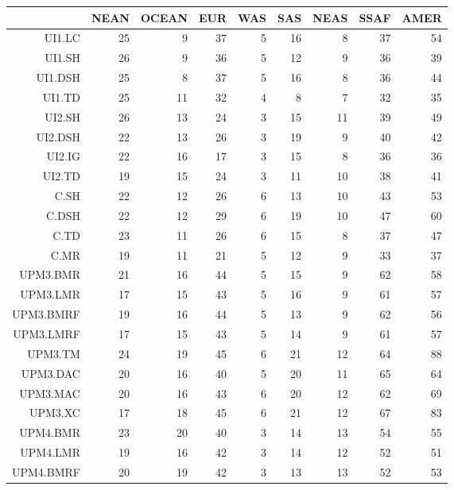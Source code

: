 \begin{longtable}{rrrrrrrrr}
  \hline
 & NEAN & OCEAN & EUR & WAS & SAS & NEAS & SSAF & AMER \\ 
  \hline
UI1.LC &  25 &   9 &  37 &   5 &  16 &   8 &  37 &  54 \\ 
  UI1.SH &  26 &   9 &  36 &   5 &  12 &   9 &  36 &  39 \\ 
  UI1.DSH &  25 &   8 &  37 &   5 &  16 &   8 &  36 &  44 \\ 
  UI1.TD &  25 &  11 &  32 &   4 &   8 &   7 &  32 &  35 \\ 
  UI2.SH &  26 &  13 &  24 &   3 &  15 &  11 &  39 &  49 \\ 
  UI2.DSH &  22 &  13 &  26 &   3 &  19 &   9 &  40 &  42 \\ 
  UI2.IG &  22 &  16 &  17 &   3 &  15 &   8 &  36 &  36 \\ 
  UI2.TD &  19 &  15 &  24 &   3 &  11 &  10 &  38 &  41 \\ 
  C.SH &  22 &  12 &  26 &   6 &  13 &  10 &  43 &  53 \\ 
  C.DSH &  22 &  12 &  29 &   6 &  19 &  10 &  47 &  60 \\ 
  C.TD &  23 &  11 &  26 &   6 &  15 &   8 &  37 &  47 \\ 
  C.MR &  19 &  11 &  21 &   5 &  12 &   9 &  33 &  37 \\ 
  UPM3.BMR &  21 &  16 &  44 &   5 &  15 &   9 &  62 &  58 \\ 
  UPM3.LMR &  17 &  15 &  43 &   5 &  16 &   9 &  61 &  57 \\ 
  UPM3.BMRF &  19 &  16 &  44 &   5 &  13 &   9 &  62 &  56 \\ 
  UPM3.LMRF &  17 &  15 &  43 &   5 &  14 &   9 &  61 &  57 \\ 
  UPM3.TM &  24 &  19 &  45 &   6 &  21 &  12 &  64 &  88 \\ 
  UPM3.DAC &  20 &  16 &  40 &   5 &  20 &  11 &  65 &  64 \\ 
  UPM3.MAC &  20 &  16 &  43 &   6 &  20 &  12 &  62 &  69 \\ 
  UPM3.XC &  17 &  18 &  45 &   6 &  21 &  12 &  67 &  83 \\ 
  UPM4.BMR &  23 &  20 &  40 &   3 &  14 &  13 &  54 &  55 \\ 
  UPM4.LMR &  19 &  16 &  42 &   3 &  14 &  12 &  52 &  51 \\ 
  UPM4.BMRF &  20 &  19 &  42 &   3 &  13 &  13 &  52 &  53 \\ 

\end{longtable}
